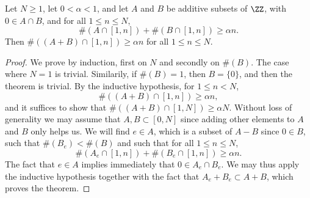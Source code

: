 \begin{theorem}
    Let $N \geq 1$, let $0 < \alpha < 1$, and let $A$ and $B$ be additive subsets of $\ZZ$, with $0 \in A \cap B$, and for all $1 \leq n \leq N$,
    \[ \#(A \cap [1,n]) + \#(B \cap [1,n]) \geq \alpha n. \]
    Then $\#((A + B) \cap [1,n]) \geq \alpha n$ for all $1 \leq n \leq N$.
\end{theorem}
\begin{proof}
    We prove by induction, first on $N$ and secondly on $\#(B)$. The case where $N = 1$ is trivial. Similarily, if $\#(B) = 1$, then $B = \{ 0 \}$, and then the theorem is trivial. By the inductive hypothesis, for $1 \leq n < N$,
    \[ \#((A + B) \cap [1,n]) \geq \alpha n, \]
    and it suffices to show that $\#((A + B) \cap [1,N]) \geq \alpha N$. Without loss of generality we may assume that $A,B \subset [0,N]$ since adding other elements to $A$ and $B$ only helps us. We will find $e \in A$, which is a subset of $A - B$ since $0 \in B$, such that $\#(B_e) < \#(B)$ and such that for all $1 \leq n \leq N$,
    \[ \#(A_e \cap [1,n]) + \#(B_e \cap [1,n]) \geq \alpha n. \]
    The fact that $e \in A$ implies immediately that $0 \in A_e \cap B_e$. We may thus apply the inductive hypothesis together with the fact that $A_e + B_e \subset A + B$, which proves the theorem.


\end{proof}
